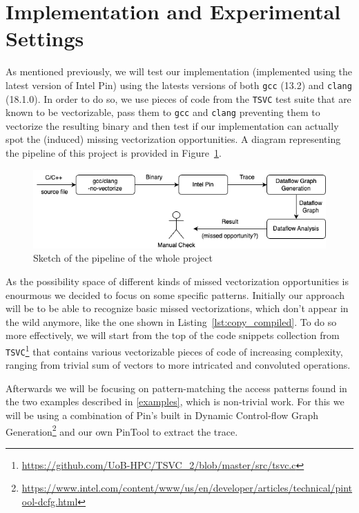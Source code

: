 \documentclass[acmsmall,review, nonacm]{acmart}
\begin{document}
\section{Implementation and Experimental Settings}
As mentioned previously, we will test our implementation (implemented using the latest version of Intel Pin) using the latests versions of 
both \texttt{gcc} (13.2) and \texttt{clang} (18.1.0). In order to do so, we use pieces of code from the \texttt{TSVC} test suite
that are known to be vectorizable, pass them to \texttt{gcc} and \texttt{clang} preventing them to vectorize the resulting binary and then test 
if our implementation can actually spot the (induced) missing vectorization opportunities. 
A diagram representing the pipeline of this project is provided in Figure~\ref{fig:pipeline}.

\begin{figure}[h!]
  \includegraphics*[width=0.9\linewidth]{img/pipeline.png}
  \caption{Sketch of the pipeline of the whole project}
  \label{fig:pipeline}
\end{figure}

As the possibility space of different kinds of missed vectorization opportunities is enourmous we decided to focus on some specific patterns.
Initially our approach will be to be able to recognize basic missed 
vectorizations, which don't appear in the wild anymore, like the one shown in Listing~\ref{lst:copy_compiled}. To do so more effectively, we will start from the top of the code snippets collection from \texttt{TSVC}\footnote{\url{https://github.com/UoB-HPC/TSVC_2/blob/master/src/tsvc.c}} that contains
various vectorizable pieces of code of increasing complexity, ranging from trivial sum of vectors to more intricated and convoluted operations.

Afterwards we will be focusing on pattern-matching the access patterns found in the two examples described in \ref{examples}, which is non-trivial work.
For this we will be using a combination of Pin's built in Dynamic Control-flow Graph Generation\footnote{\url{https://www.intel.com/content/www/us/en/developer/articles/technical/pintool-dcfg.html}} 
and our own PinTool to extract the trace.
\end{document}
